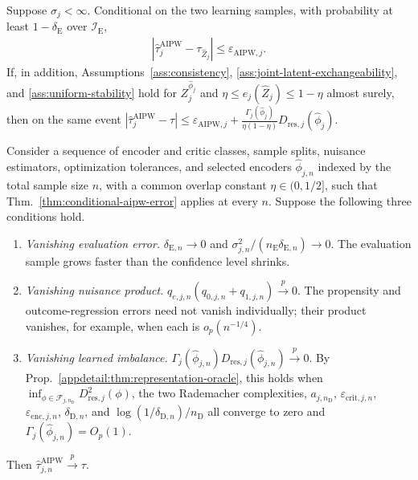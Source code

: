 \begin{theorem}
\label{appdetail:thm:conditional-aipw-error}
\normalfont

Suppose $\sigma_j<\infty$. Conditional on the two learning samples, with probability at least $1-\delta_{\mathrm E}$ over $\mathcal I_{\mathrm E}$,
\begin{align}
|\widehat\tau_j^{\mathrm{AIPW}}-\tau_{\widehat Z_j}|
\le
\varepsilon_{\mathrm{AIPW},j}.
\label{eq:conditional-aipw-error}
\end{align}
If, in addition, Assumptions~\ref{ass:consistency}, \ref{ass:joint-latent-exchangeability}, and \ref{ass:uniform-stability} hold for $Z_j^{\widehat\phi_j}$ and $\eta\le e_j(\widehat Z_j)\le1-\eta$ almost surely, then on the same event
\(|\widehat\tau_j^{\mathrm{AIPW}}-\tau| \le \varepsilon_{\mathrm{AIPW},j} + \frac{\Gamma_j(\widehat\phi_j)}{\eta(1-\eta)} D_{\mathrm{res},j}(\widehat\phi_j).\)

\end{theorem}

\begin{corollary}[Consistency]
\label{cor:learned-aipw-consistency}
\normalfont

Consider a sequence of encoder and critic classes, sample splits, nuisance estimators, optimization tolerances, and selected encoders $\widehat\phi_{j,n}$ indexed by the total sample size $n$, with a common overlap constant $\eta\in(0,1/2]$, such that Thm.~\ref{thm:conditional-aipw-error} applies at every $n$. Suppose the following three conditions hold.
\begin{enumerate}[label=(C\arabic*),leftmargin=*]
\item \textit{Vanishing evaluation error.} $\delta_{\mathrm E,n}\to0$ and $\sigma_{j,n}^2/(n_{\mathrm E}\delta_{\mathrm E,n})\to0$. The evaluation sample grows faster than the confidence level shrinks.
\item \textit{Vanishing nuisance product.} $q_{e,j,n}(q_{0,j,n}+q_{1,j,n})\xrightarrow{p}0$. The propensity and outcome-regression errors need not vanish individually; their product vanishes, for example, when each is $o_p(n^{-1/4})$.
\item \textit{Vanishing learned imbalance.} $\Gamma_j(\widehat\phi_{j,n})D_{\mathrm{res},j}(\widehat\phi_{j,n})\xrightarrow{p}0$. By Prop.~\ref{appdetail:thm:representation-oracle}, this holds when $\inf_{\phi\in\mathcal F_{j,n_{\mathrm D}}}D_{\mathrm{res},j}^2(\phi)$, the two Rademacher complexities, $a_{j,n_{\mathrm D}}$, $\varepsilon_{\mathrm{crit},j,n}$, $\varepsilon_{\mathrm{enc},j,n}$, $\delta_{\mathrm D,n}$, and $\log(1/\delta_{\mathrm D,n})/n_{\mathrm D}$ all converge to zero and $\Gamma_j(\widehat\phi_{j,n})=O_p(1)$.
\end{enumerate}
Then $\widehat\tau_{j,n}^{\mathrm{AIPW}}\xrightarrow{p}\tau$.

\end{corollary}

